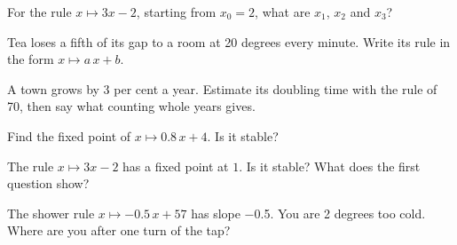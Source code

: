 \begin{checkpoint}
\item For the rule $x \mapsto 3x - 2$, starting from $x_0 = 2$, what are
  $x_1$, $x_2$ and $x_3$?
\item Tea loses a fifth of its gap to a room at 20 degrees every minute.
  Write its rule in the form $x \mapsto a\,x + b$.
\item A town grows by 3 per cent a year. Estimate its doubling time with
  the rule of 70, then say what counting whole years gives.
\item Find the fixed point of $x \mapsto \num{0.8}\,x + 4$. Is it stable?
\item The rule $x \mapsto 3x - 2$ has a fixed point at $1$. Is it stable?
  What does the first question show?
\item The shower rule $x \mapsto \num{-0.5}\,x + 57$ has slope \num{-0.5}.
  You are 2 degrees too cold. Where are you after one turn of the tap?
\end{checkpoint}
